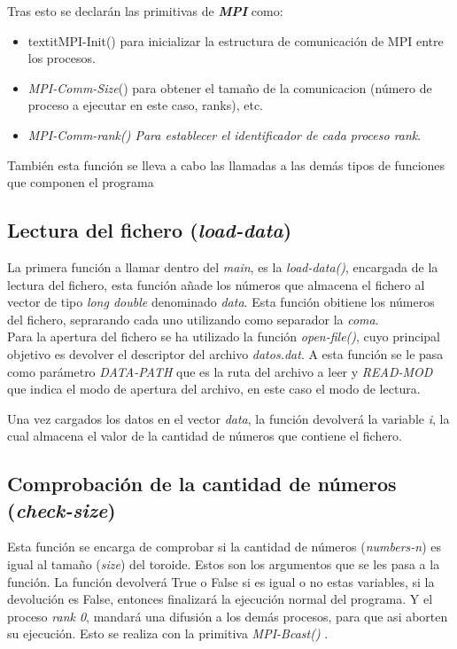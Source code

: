 \documentclass[11pt]{article}
\begin{document}
Tras esto se declarán las primitivas de \textit{\textbf{MPI}} como: 
\begin{itemize}
	\item textit{MPI-Init}() para inicializar la estructura de comunicación de MPI entre los procesos. 
	\item \textit{MPI-Comm-Size}() para obtener el tamaño de la comunicacion (número de proceso a ejecutar en este caso, ranks), etc.
	\item \textit{MPI-Comm-rank() Para establecer el identificador de cada proceso \textit{rank}}.
\end{itemize}

También esta función se lleva a cabo las llamadas a las demás tipos de funciones que componen el programa



\subsection{Lectura del fichero (\textit{load-data})}
La primera función a llamar dentro del \textit{main}, es la \textit{load-data()}, encargada de la lectura del fichero, esta función añade los números que almacena el fichero al vector de tipo \textit{long double} denominado \textit{data}.
Esta función obitiene los números del fichero, seprarando cada uno utilizando como separador la \textit{coma}.\\

Para la apertura del fichero se ha utilizado la función \textit{open-file()}, cuyo principal objetivo es devolver el descriptor del archivo \textit{datos.dat}.
A esta función se le pasa como parámetro \textit{DATA-PATH} que es la ruta del archivo a leer y \textit{READ-MOD} que indica el modo de apertura del archivo, en este caso el modo de lectura.


Una vez cargados los datos en el vector \textit{data}, la función devolverá la variable \textit{i}, la cual almacena el valor de la cantidad de números que contiene el fichero.


\subsection{Comprobación de la cantidad de números (\textit{check-size})}
Esta función se encarga de comprobar si la cantidad de números (\textit{numbers-n}) es igual al tamaño (\textit{size}) del toroide. Estos son los argumentos que se les pasa a la función.
La función devolverá True o False si es igual o no estas variables, si la devolución es False, entonces finalizará la ejecución normal del programa. Y el proceso \textit{rank 0}, mandará una difusión a los demás procesos, para que asi aborten su ejecución. Esto se realiza con la primitiva \textit{MPI-Bcast()} \citep{mpi_bcast}. 
\end{document}
